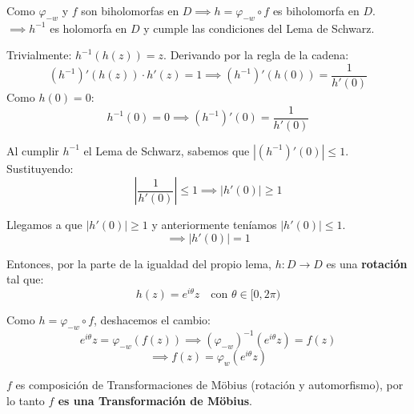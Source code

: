 {Como $\varphi_{-w}$ y $f$ son biholomorfas en $D \implies h = \varphi_{-w} \circ f$ es biholomorfa en $D$.
$\implies h^{-1}$ es holomorfa en $D$ y cumple las condiciones del Lema de Schwarz.

Trivialmente: $h^{-1}(h(z)) = z$. Derivando por la regla de la cadena:
\[
(h^{-1})'(h(z)) \cdot h'(z) = 1 \implies (h^{-1})'(h(0)) = \frac{1}{h'(0)}
\]
Como $h(0)=0$:
\[
h^{-1}(0) = 0 \implies (h^{-1})'(0) = \frac{1}{h'(0)}
\]

Al cumplir $h^{-1}$ el Lema de Schwarz, sabemos que $|(h^{-1})'(0)| \le 1$. Sustituyendo:
\[
\left| \frac{1}{h'(0)} \right| \le 1 \implies |h'(0)| \ge 1
\]

Llegamos a que $|h'(0)| \ge 1$ y anteriormente teníamos $|h'(0)| \le 1$.
\[
\implies |h'(0)| = 1
\]

Entonces, por la parte de la igualdad del propio lema, $h: D \to D$ es una \textbf{rotación} tal que:
\[
h(z) = e^{i\theta}z \quad \text{con } \theta \in [0, 2\pi)
\]

Como $h = \varphi_{-w} \circ f$, deshacemos el cambio:
\[
e^{i\theta}z = \varphi_{-w}(f(z)) \implies (\varphi_{-w})^{-1}(e^{i\theta}z) = f(z)
\]
\[
\implies f(z) = \varphi_{w}(e^{i\theta}z)
\]

$f$ es composición de Transformaciones de Möbius (rotación y automorfismo), por lo tanto \textbf{$f$ es una Transformación de Möbius}.
}
